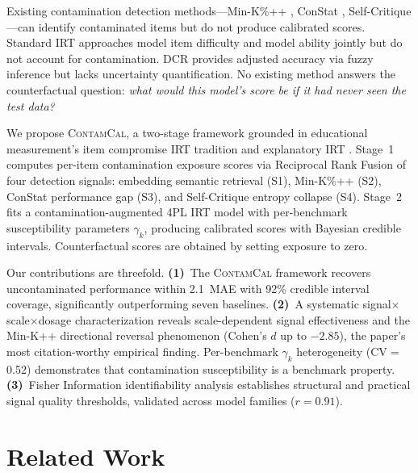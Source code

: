 \documentclass[11pt,a4paper]{article}
\newcommand{\contcal}{\textsc{ContamCal}}
\newcommand{\pp}{\,\text{pp}}
\begin{document}
Existing contamination detection methods---Min-K\%++ \citep{shi2024detecting}, ConStat \citep{dekoninck2024constat}, Self-Critique \citep{weller2024selfcritique}---can identify contaminated items but do not produce calibrated scores.
Standard IRT approaches model item difficulty and model ability jointly \citep{lalor2024benchmarking,polo2024tinybenchmarks} but do not account for contamination.
DCR \citep{yang2025dcr} provides adjusted accuracy via fuzzy inference but lacks uncertainty quantification.
No existing method answers the counterfactual question: \emph{what would this model's score be if it had never seen the test data?}

We propose \contcal{}, a two-stage framework grounded in educational measurement's item compromise IRT tradition \citep{eckerly2017detecting,sinharay2017assessment} and explanatory IRT \citep{deboeck2004explanatory}.
Stage~1 computes per-item contamination exposure scores via Reciprocal Rank Fusion \citep{cormack2009reciprocal} of four detection signals: embedding semantic retrieval (S1), Min-K\%++ (S2), ConStat performance gap (S3), and Self-Critique entropy collapse (S4).
Stage~2 fits a contamination-augmented 4PL IRT model with per-benchmark susceptibility parameters $\gamma_k$, producing calibrated scores with Bayesian credible intervals.
Counterfactual scores are obtained by setting exposure to zero.

Our contributions are threefold.
\textbf{(1)}~The \contcal{} framework recovers uncontaminated performance within 2.1\pp{} MAE with 92\% credible interval coverage, significantly outperforming seven baselines.
\textbf{(2)}~A systematic signal$\times$scale$\times$dosage characterization reveals scale-dependent signal effectiveness and the Min-K++ directional reversal phenomenon (Cohen's $d$ up to $-2.85$), the paper's most citation-worthy empirical finding.
Per-benchmark $\gamma_k$ heterogeneity (CV$=$0.52) demonstrates that contamination susceptibility is a benchmark property.
\textbf{(3)}~Fisher Information identifiability analysis establishes structural and practical signal quality thresholds, validated across model families ($r=0.91$).


\section{Related Work}
\end{document}
